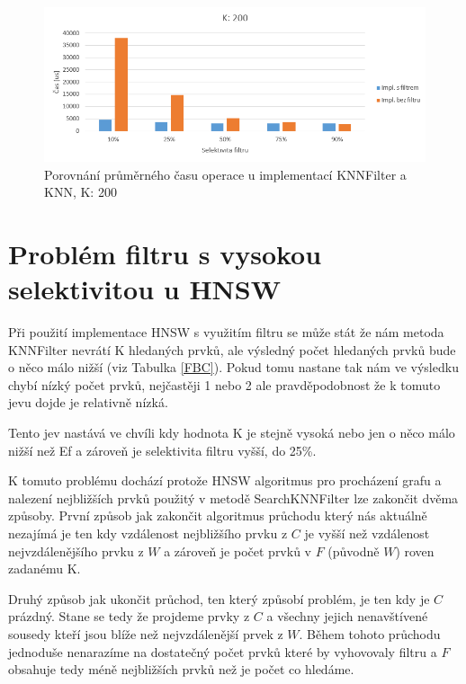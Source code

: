 \documentclass[czech,semestral,dept460,male,csharp,cpdeclaration]{diploma}
\begin{document}
		\begin{figure}
			\centering
			\includegraphics[scale=0.8]{Figures/graf_filtr_k200.png}
			\caption{Porovnání průměrného času operace u implementací KNNFilter a KNN, K: 200}
			\label{graf_filtr_k200}
		\end{figure}
		
		\section{Problém filtru s vysokou selektivitou u HNSW}
		\label{FP}
		
			Při použití implementace HNSW s využitím filtru se může stát že nám metoda KNNFilter nevrátí K hledaných prvků, ale výsledný počet hledaných prvků bude o něco málo nižší (viz Tabulka \ref{FBC}). Pokud tomu nastane tak nám ve výsledku chybí nízký počet prvků, nejčastěji 1 nebo 2 ale pravděpodobnost že k tomuto jevu dojde je relativně nízká.
			
			Tento jev nastává ve chvíli kdy hodnota K je stejně vysoká nebo jen o něco málo nižší než Ef a zároveň je selektivita filtru vyšší, do 25\%.
			
			K tomuto problému dochází protože HNSW algoritmus pro procházení grafu a nalezení nejbližších prvků použitý v metodě SearchKNNFilter lze zakončit dvěma způsoby. První způsob jak zakončit algoritmus průchodu který nás aktuálně nezajímá je ten kdy vzdálenost nejbližšího prvku z $C$ je vyšší než vzdálenost nejvzdálenějšího prvku z $W$ a zároveň je počet prvků v $F$ (původně $W$) roven zadanému K.
			
			Druhý způsob jak ukončit průchod, ten který způsobí problém, je ten kdy je $C$ prázdný. Stane se tedy že projdeme prvky z $C$ a všechny jejich nenavštívené sousedy kteří jsou blíže než nejvzdálenější prvek z $W$. Během tohoto průchodu jednoduše nenarazíme na dostatečný počet prvků které by vyhovovaly filtru a $F$ obsahuje tedy méně nejbližších prvků než je počet co hledáme.
			
\end{document}
